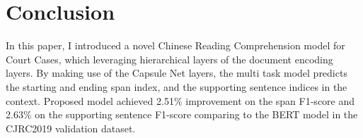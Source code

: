 \documentclass[11pt,a4paper]{article}
\begin{document}
%

\section{Conclusion}

In this paper, I introduced a novel Chinese Reading Comprehension model for Court Cases, which leveraging hierarchical layers of the document encoding layers.
By making use of the Capsule Net layers, the multi task model predicts the starting and ending span index, and the supporting sentence indices in the context.
Proposed model achieved 2.51\% improvement on the span F1-score and 2.63\% on the supporting sentence F1-score comparing to the BERT model in the CJRC2019 validation dataset.





\end{document}
